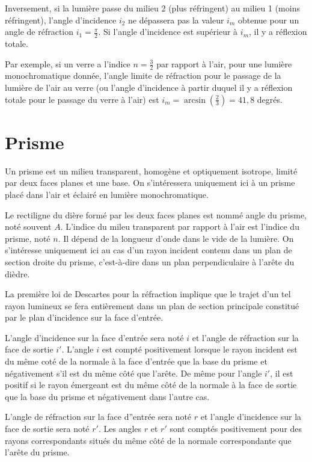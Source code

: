 Inversement, si la lumière passe du milieu 2 (plus réfringent) au milieu 1 
(moins réfringent), l'angle d'incidence \(i_2\) ne dépassera pas la valeur 
\(i_m\) obtenue pour un angle de réfraction \(i_1 = \frac{\pi}{2}\). Si l'angle 
d'incidence est supérieur à \(i_m\), il y a réflexion totale.

Par exemple, si un verre a l'indice \(n=\frac{3}{2}\) par rapport à l'air, pour 
une lumière monochromatique donnée, l'angle limite de réfraction pour le 
passage de la lumière de l'air au verre (ou l'angle d'incidence à partir duquel 
il y a réflexion totale pour le passage du verre à l'air) est \(i_m = 
\arcsin\left(\frac{2}{3}\right) = 41,8\)
 degrés.
\section{Prisme}\label{chap6-sec:prisme}%

Un prisme est un milieu transparent, homogène et optiquement isotrope, limité 
par deux faces planes et une base. On s'intéressera uniquement ici à un prisme 
placé dans l'air et éclairé en lumière monochromatique.

Le rectiligne du dière formé par les deux faces planes est nommé angle du 
prisme, noté souvent \(A\). L'indice du mileu transparent par rapport à l'air 
est l'indice du prisme, noté \(n\). Il dépend de la longueur d'onde dans le 
vide de la lumière. On s'intéresse uniquement ici au cas d'un rayon incident 
contenu dans un plan de section droite du prisme, c'est-à-dire dans un plan 
perpendiculaire à l'arête du dièdre.

La première loi de Descartes pour la réfraction implique que le trajet d'un tel 
rayon lumineux se fera entièrement dans un plan de section principale constitué 
par le plan d'incidence sur la face d'entrée.

L'angle d'incidence sur la face d'entrée sera noté \(i\) et l'angle de 
réfraction sur la face de sortie \(i'\). L'angle \(i\) est compté positivement 
lorsque le rayon incident est du même coté de la normale à la face d'entrée que 
la base du prisme et négativement s'il est du même côté que l'arête. De même 
pour l'angle \(i'\), il est positif si le rayon émergeant est du même côté de 
la normale à la face de sortie que la base du prisme et négativement dans 
l'autre cas.

L'angle de réfraction sur la face d''entrée sera noté \(r\) et l'angle 
d'incidence sur la face de sortie sera noté \(r'\). Les angles \(r\) et \(r'\) 
sont comptés positivement pour des rayons correspondants situés du même côté de 
la normale correspondante que l'arête du prisme.

